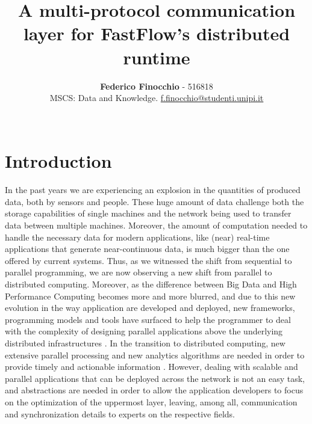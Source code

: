 \documentclass[12pt]{article}
\title{\vspace{-2cm}\textbf{A multi-protocol communication layer for FastFlow's distributed runtime}}
\author{
    \normalsize{\textbf{Federico Finocchio} - 516818}\\
    \normalsize{MSCS: Data and Knowledge. \underline{f.finocchio@studenti.unipi.it}}\\\\
}
\makeatletter
\renewenvironment{abstract}{%
    \if@twocolumn
      \section*{\abstractname}%
    \else %
      \begin{center}%
        {\bfseries \normalsize\abstractname\vspace{\z@}}%
      \end{center}%
      \quotation
    \fi}
    {\if@twocolumn\else\endquotation\fi}
\makeatother
\begin{document}
\date{}
\maketitle
    
\tableofcontents
\newpage
\sloppy
\section*{Introduction}
\label{introduction}
In the past years we are experiencing an explosion in the quantities of produced data, both by sensors and people. These huge amount of data challenge both the storage capabilities of single machines and the network being used to transfer data between multiple machines. Moreover, the amount of computation needed to handle the necessary data for modern applications, like (near) real-time applications that generate near-continuous data, is much bigger than the one offered by current systems. Thus, as we witnessed the shift from sequential to parallel programming, we are now observing a new shift from parallel to distributed computing. Moreover, as the difference between Big Data and High Performance Computing becomes more and more blurred, and due to this new evolution in the way application are developed and deployed, new frameworks, programming models and tools have surfaced to help the programmer to deal with the complexity of designing parallel applications above the underlying distributed infrastructures \cite{survey-distributed}. In the transition to distributed computing, new extensive parallel processing and new analytics algorithms are needed in order to provide timely and actionable information \cite{big-data-movingforward}. However, dealing with scalable and parallel applications that can be deployed across the network is not an easy task, and abstractions are needed in order to allow the application developers to focus on the optimization of the uppermost layer, leaving, among all, communication and synchronization details to experts on the respective fields.
\end{document}
